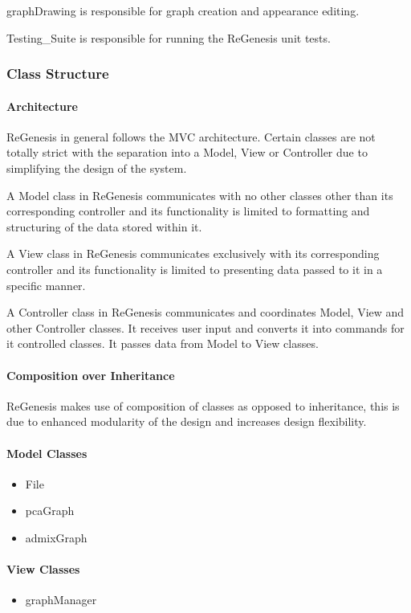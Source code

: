\documentclass[11pt]{article}
\begin{document}
\hfill \newline
graphDrawing is responsible for graph creation and appearance editing.

\hfill \newline
Testing\_Suite is responsible for running the ReGenesis unit tests.

\subsubsection{Class Structure}

\paragraph{Architecture}
ReGenesis in general follows the MVC architecture. Certain classes are not totally strict with the separation into a Model, View or Controller due to simplifying the design of the system. 

A Model class in ReGenesis communicates with no other classes other than its corresponding controller and its functionality is limited to formatting and structuring of the data stored within it.
 
A View class in ReGenesis communicates exclusively with its corresponding controller and its functionality is limited to presenting data passed to it in a specific manner.

A Controller class in ReGenesis communicates and coordinates Model, View and other Controller classes. It receives user input and converts it into commands for it controlled classes. It passes data from Model to View classes.
\paragraph{Composition over Inheritance}

ReGenesis makes use of composition of classes as opposed to inheritance, this is due to enhanced modularity of the design and increases design flexibility.
\paragraph{Model Classes}
\begin{itemize}
	\item File
	\item pcaGraph
	\item admixGraph
\end{itemize}

\paragraph{View Classes}
\begin{itemize}
	\item  graphManager
	
\end{itemize}
\end{document}

